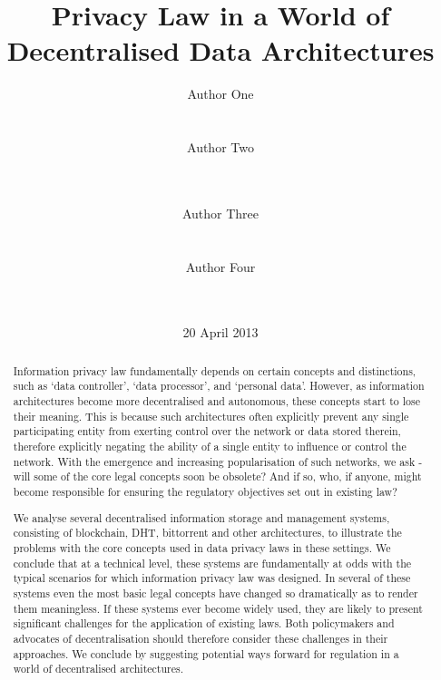 \documentclass{acm_proc_article-sp}
\begin{document}
\title{Privacy Law in a World of Decentralised Data Architectures}
\subtitle{}

\author{
\alignauthor
Author One\\
       \\
       \\
\alignauthor
Author Two\\
       \\
       \\
\and %
\alignauthor
Author Three\\
       \\
       \\
\alignauthor
Author Four\\
       \\
       \\
}

\date{20 April 2013}


\maketitle
\begin{abstract}
Information privacy law fundamentally depends on certain concepts and distinctions, such as ‘data controller’, ‘data processor’, and ‘personal data’. However, as information architectures become more decentralised and autonomous, these concepts start to lose their meaning. This is because such architectures often explicitly prevent any single participating entity from exerting control over the network or data stored therein, therefore explicitly negating the ability of a single entity to influence or control the network. With the emergence and increasing popularisation of such networks, we ask - will some of the core legal concepts soon be obsolete? And if so, who, if anyone, might become responsible for ensuring the regulatory objectives set out in existing law?
 
We analyse several decentralised information storage and management systems, consisting of blockchain, DHT, bittorrent and other architectures, to illustrate the problems with the core concepts used in data privacy laws in these settings. We conclude that at a technical level, these systems are fundamentally at odds with the typical scenarios for which information privacy law was designed. In several of these systems even the most basic legal concepts have changed so dramatically as to render them meaningless. If these systems ever become widely used, they are likely to present significant challenges for the application of existing laws. Both policymakers and advocates of decentralisation should therefore consider these challenges in their approaches. We conclude by suggesting potential ways forward for regulation in a world of decentralised architectures. 
\end{abstract}
\end{document}
